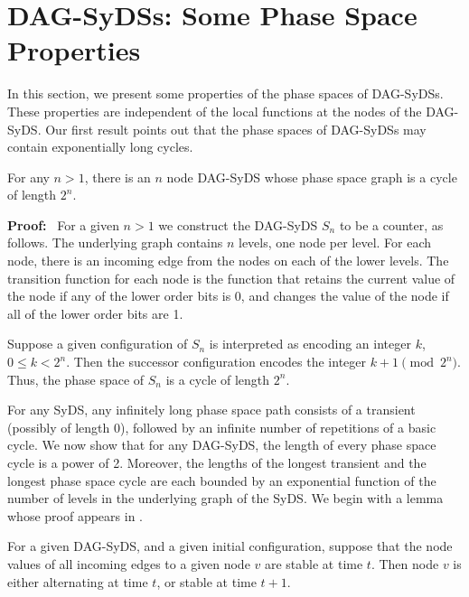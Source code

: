 \section{DAG-SyDSs: Some Phase Space Properties}
\label{sec:bounded-levels}

In this section, we present some properties of the
phase spaces of DAG-SyDSs.
These properties are independent of the local functions
at the nodes of the DAG-SyDS.
Our first result points out that the phase spaces
of DAG-SyDSs may contain exponentially long cycles.

\smallskip
\begin{proposition}\label{pro:long_phase_space_cycle}
For any $n  > 1$, there is an $n$ node DAG-SyDS 
whose phase space graph is a cycle of length $2^n$.
\end{proposition}

\noindent
\textbf{Proof:}~ 
For a given $n > 1$ we construct the DAG-SyDS $S_n$ to be a counter, as follows.
The underlying graph contains $n$ levels, one node per level. 
For each node, there is an incoming edge from the nodes on each of the lower levels.
The transition function for each node is the function 
that retains the current value of the node if any of the lower order bits is 0,
and changes the value of the node if all of the lower order bits are 1.

Suppose a given configuration of $S_n$ is interpreted as encoding
an integer $k$, $0 \leq k < 2^n$.  Then the successor configuration
encodes the integer $k + 1 \pmod{2^n}$.  Thus, the phase space of
$S_n$ is a cycle of length $2^n$.  \QED

\smallskip

For any SyDS, any infinitely long phase space path consists of a
transient (possibly of length 0), followed by an infinite number
of repetitions of a basic cycle.  We now show that for any 
DAG-SyDS, the length of every phase space cycle is a power of 2.
Moreover, the lengths of the longest transient and the longest phase
space cycle are each bounded by an exponential function of the
number of levels in the underlying graph of the SyDS.
We begin with a lemma whose proof appears in \cite{Rosenkrantz-etal-2020}.

\smallskip

\begin{lemma}\label{lem:all_inputs_stable}
For a given DAG-SyDS, and a given initial configuration, suppose
that the node values of all incoming edges to a given node $v$ are
stable at time $t$.  Then node $v$ is either alternating at time
$t$, or stable at time $t+1$.
\end{lemma}

